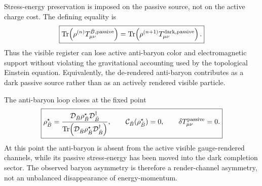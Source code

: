 \documentclass[11pt]{article}
\DeclareMathOperator{\Tr}{Tr}
\begin{document}
Stress-energy preservation is imposed on the passive source, not on the active
charge cost.  The defining equality is
\begin{equation}
\label{eq:section-six-stress-energy-preservation}
 \boxed{
 \Tr\!\left(\rho^{(n)}T_{\mu\nu}^{\bar B,{\rm passive}}\right)
 =
 \Tr\!\left(\rho^{(n+1)}T_{\mu\nu}^{{\rm dark},{\rm passive}}\right).
 }
\end{equation}
Thus the visible register can lose active anti-baryon color and electromagnetic
support without violating the gravitational accounting used by the topological
Einstein equation.  Equivalently, the de-rendered anti-baryon contributes as a
dark passive source rather than as an actively rendered visible particle.

The anti-baryon loop closes at the fixed point
\begin{equation}
\label{eq:section-six-antibaryon-fixed-point}
 \boxed{
 \rho_{\bar B}^{\star}
 =
 \frac{
 \mathcal D_{\bar B}\rho_{\bar B}^{\star}\mathcal D_{\bar B}^{\dagger}}
 {\Tr\!\left(
 \mathcal D_{\bar B}\rho_{\bar B}^{\star}\mathcal D_{\bar B}^{\dagger}
 \right)},
 \qquad
 \mathcal C_{\bar B}(\rho_{\bar B}^{\star})=0,
 \qquad
 \delta T_{\mu\nu}^{\rm passive}=0.
 }
\end{equation}
At this point the anti-baryon is absent from the active visible gauge-rendered
channels, while its passive stress-energy has been moved into the dark
completion sector.  The observed baryon asymmetry is therefore a render-channel
asymmetry, not an unbalanced disappearance of energy-momentum.
\end{document}
